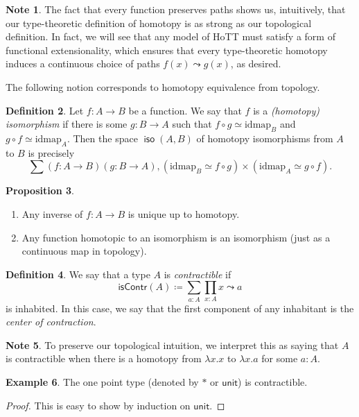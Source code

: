 \documentclass[10pt,letterpaper,cm]{nupset}
\theoremstyle{definition}
\newtheorem{definition}{Definition}[subsection]
\newtheorem{exmp}[definition]{Example}
\newtheorem{note}[definition]{Note}
\theoremstyle{theorem}
\newtheorem{prop}[definition]{Proposition}
\theoremstyle{remark}
\newcommand{\1}{\mathbf{1}}
\newcommand{\0}{\vec 0}
\DeclareMathOperator{\iso}{\mathsf{iso}}
\begin{document}
\begin{note}
The fact that every function preserves paths shows us, intuitively, that our type-theoretic definition of homotopy is as strong as our topological definition. In fact, we will see that any model of HoTT must satisfy a form of functional extensionality, which ensures that every type-theoretic homotopy induces a continuous choice of paths $f(x) \leadsto g(x)$, as desired.
\end{note}

The following notion corresponds to homotopy equivalence from topology.

\begin{definition}
Let $f: A \to B$ be a function. We say that $f$ is a \textit{(homotopy) isomorphism} if there is some $g:  B \to A$ such that $f \circ g \simeq \text{idmap}_B$ and $g\circ f \simeq \text{idmap}_A$. Then the space $\iso(A,B)$ of homotopy isomorphisms from $A$ to $B$ is precisely $$\sum(f:A\to B)(g:B \to A), (\text{idmap}_B \simeq f\circ g) \times  (\text{idmap}_A \simeq g\circ f).$$
\end{definition}

\begin{prop} $ $
\begin{enumerate}
\item Any inverse of $f: A \to B$ is unique up to homotopy. 
\item  Any function homotopic to an isomorphism is an isomorphism (just as a continuous map in topology).
\end{enumerate}
\end{prop}

\begin{definition}
We say that a type $A$ is \textit{contractible} if 
\[
\mathsf{isContr}(A)\coloneqq \sum_{a:A}\prod_{x:A}x \leadsto a
\] is inhabited. In this case, we say that the first component of any inhabitant is the \textit{center of contraction}.
\end{definition}
\begin{note}
To preserve our topological intuition, we interpret this as saying that $A$ is contractible when there is a homotopy from $\lambda x.x$ to $\lambda x.a$ for some $a:A$.
\end{note}

\begin{exmp}
The one point type (denoted by $\ast$ or $\mathsf{unit}$) is contractible.
\end{exmp}
\begin{proof}
This is easy to show by induction on $\mathsf{unit}$.
\end{proof}
\end{document}
